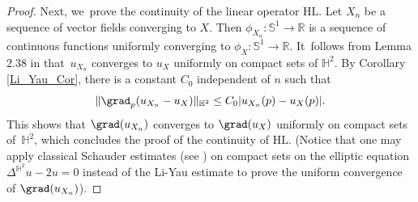 \begin{proof}
Next, we~prove the continuity of the linear operator $\mathrm{HL}$. Let $X_n$ be a sequence of vector fields converging to $X$. Then $\phi_{X_n}:\mathbb{S}^1 \to \mathbb{R}$ is a sequence of continuous functions uniformly converging to $\phi_X:\mathbb{S}^1 \to \mathbb{R}$. It~follows from Lemma 2.38 in \cite{barbotfillastre} that~$u_{X_n}$ converges to $u_X$ uniformly on compact sets of $\mathbb{H}^2$. By Corollary \ref{Li_Yau_Cor}, there is a constant $C_0$ independent of $n$ such that
\[
\lVert \grad_p(u_{X_n}-u_X)\rVert_{\mathbb{H}^2}\leq C_0\lvert u_{X_n}(p)-u_X(p)\rvert.
\]
This shows that $\grad(u_{X_n})$ converges to $\grad(u_X)$ uniformly on compact sets of~$\mathbb{H}^2$, which concludes the proof of the continuity of $\mathrm{HL}$. (Notice that one may apply classical Schauder estimates (see \cite{PDE_Book}) on compact sets on the elliptic equation $\Delta^{\mathbb{H}^2} u - 2u=0$ instead of the Li-Yau estimate to prove the uniform convergence of $\grad(u_{X_n})$).


\end{proof}
